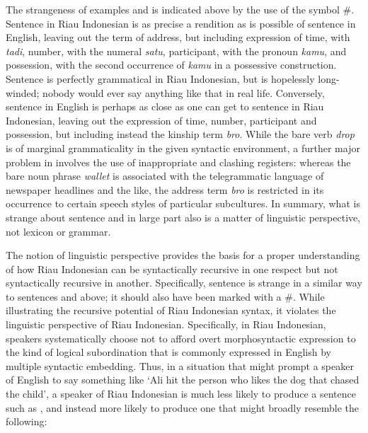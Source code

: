 \documentclass[output=paper,colorlinks,citecolor=brown
]{langscibook}
\begin{document}
The strangeness of examples  and  is indicated above by the use of the symbol \#.  Sentence  in Riau Indonesian is as precise a rendition as is possible of sentence  in English, leaving out the term of address, but including expression of time, with \textit{tadi}, number, with the numeral \textit{satu}, participant, with the pronoun \textit{kamu}, and possession, with the second occurrence of \textit{kamu} in a possessive construction.  Sentence  is perfectly grammatical in Riau Indonesian, but is hopelessly long-winded; nobody would ever say anything like that in real life.  Conversely, sentence  in English is perhaps as close as one can get to sentence  in Riau Indonesian, leaving out the expression of time, number, participant and possession, but including instead the kinship term \textit{bro}.  While the bare verb \textit{drop} is of marginal grammaticality in the given syntactic environment, a further major problem in  involves the use of inappropriate and clashing registers: whereas the bare noun phrase \textit{wallet} is associated with the telegrammatic language of newspaper headlines and the like, the address term \textit{bro} is restricted in its occurrence to certain speech styles of particular subcultures.  In summary, what is strange about sentence  and in large part also  is a matter of linguistic perspective, not lexicon or grammar.

The notion of linguistic perspective provides the basis for a proper understanding of how Riau Indonesian can be syntactically recursive in one respect but not syntactically recursive in another.  Specifically, sentence  is strange in a similar way to sentences  and  above; it should also have been marked with a \#.  While illustrating the recursive potential of Riau Indonesian syntax, it violates the linguistic perspective of Riau Indonesian.  Specifically, in Riau Indonesian, speakers systematically choose not to afford overt morphosyntactic expression to the kind of logical subordination that is commonly expressed in English by multiple syntactic embedding.  Thus, in a situation that might prompt a speaker of English to say something like `Ali hit the person who likes the dog that chased the child', a speaker of Riau Indonesian is much less likely to produce a sentence such as , and instead more likely to produce one that might broadly resemble the following:
\end{document}
